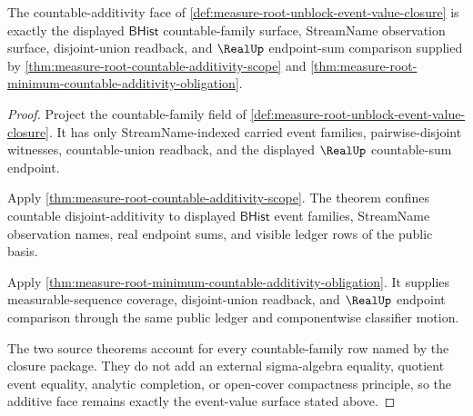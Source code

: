 \begin{theorem}
\label{thm:measure-root-unblock-countable-additivity-event-value-closure}
The countable-additivity face of
\autoref{def:measure-root-unblock-event-value-closure} is exactly the
displayed $\mathsf{BHist}$ countable-family surface, StreamName observation
surface, disjoint-union readback, and $\RealUp$ endpoint-sum comparison
supplied by \autoref{thm:measure-root-countable-additivity-scope} and
\autoref{thm:measure-root-minimum-countable-additivity-obligation}.
\end{theorem}
\begin{proof}
Project the countable-family field of
\autoref{def:measure-root-unblock-event-value-closure}. It has only
StreamName-indexed carried event families, pairwise-disjoint witnesses,
countable-union readback, and the displayed $\RealUp$ countable-sum endpoint.

Apply \autoref{thm:measure-root-countable-additivity-scope}. The theorem
confines countable disjoint-additivity to displayed $\mathsf{BHist}$ event
families, StreamName observation names, real endpoint sums, and visible
ledger rows of the public basis.

Apply \autoref{thm:measure-root-minimum-countable-additivity-obligation}.
It supplies measurable-sequence coverage, disjoint-union readback, and
$\RealUp$ endpoint comparison through the same public ledger and
componentwise classifier motion.

The two source theorems account for every countable-family row named by the
closure package. They do not add an external sigma-algebra equality,
quotient event equality, analytic completion, or open-cover compactness
principle, so the additive face remains exactly the event-value surface
stated above.
\end{proof}

